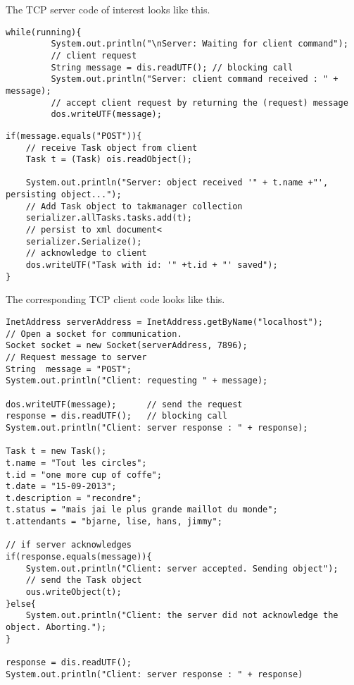 \pagebreak

The TCP server code of interest looks like this.
% 

\begin{lstlisting}[caption= servers initial request-response]
while(running){
         System.out.println("\nServer: Waiting for client command");
         // client request
         String message = dis.readUTF(); // blocking call
         System.out.println("Server: client command received : " + message);
         // accept client request by returning the (request) message
         dos.writeUTF(message);    

\end{lstlisting}

\begin{lstlisting}[caption= server POST method]
if(message.equals("POST")){
    // receive Task object from client
   	Task t = (Task) ois.readObject();
   	
   	System.out.println("Server: object received '" + t.name +"', persisting object...");
   	// Add Task object to takmanager collection
   	serializer.allTasks.tasks.add(t);
   	// persist to xml document<
   	serializer.Serialize();
   	// acknowledge to client   	
   	dos.writeUTF("Task with id: '" +t.id + "' saved");
}

\end{lstlisting}


The corresponding TCP client code looks like this.
%


\begin{lstlisting}
InetAddress serverAddress = InetAddress.getByName("localhost");            
// Open a socket for communication.
Socket socket = new Socket(serverAddress, 7896);
// Request message to server
String  message = "POST";			
System.out.println("Client: requesting " + message);

dos.writeUTF(message);		// send the request
response = dis.readUTF();	// blocking call          
System.out.println("Client: server response : " + response);         

Task t = new Task();
t.name = "Tout les circles";
t.id = "one more cup of coffe";
t.date = "15-09-2013";	
t.description = "recondre";
t.status = "mais jai le plus grande maillot du monde";
t.attendants = "bjarne, lise, hans, jimmy";

// if server acknowledges
if(response.equals(message)){
   	System.out.println("Client: server accepted. Sending object");
   	// send the Task object
   	ous.writeObject(t);
}else{
   	System.out.println("Client: the server did not acknowledge the object. Aborting.");
}

response = dis.readUTF();
System.out.println("Client: server response : " + response)
\end{lstlisting}



